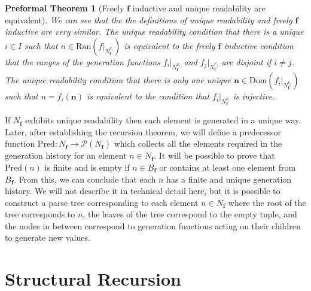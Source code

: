 \documentclass[oneside, 12pt]{book}
\theoremstyle{break}
\newtheorem{preformal definition}[definition]{Preformal Definition}
\newtheorem{preformal theorem}[theorem]{Preformal Theorem}
\newcommand{\bv}[1]{\boldsymbol{#1}}
\newcommand{\mc}[1]{\mathcal{#1}}
\begin{document}
				\begin{preformal theorem}[Freely $\bv{f}$ inductive and unique readability are equivalent]
					We can see that the the definitions of unique readability and freely $\bv{f}$ inductive are very similar.
					The unique readability condition that there is a unique $i\in I$ such that $n \in \text{Ran}\left(f|_{N_{\bv{f}}^{\nu_i}}\right)$ is equivalent to the freely $\bv{f}$ inductive condition that the ranges of the generation functions $f_i|_{N_{\bv{f}}^{\nu_i}}$ and $f_j|_{N_{\bv{f}}^{\nu_j}}$ are disjoint if $i\neq j$.
					The unique readability condition that there is only one unique $\bv{n} \in \text{Dom}\left(f_i|_{N_{\bv{f}}^{\nu_i}}\right)$ such that $n = f_i(\bv{n})$ is equivalent to the condition that $f_i|_{N_{\bv{f}}^{\nu_i}}$ is injective.
				\end{preformal theorem}
				
				If $N_{\bv{f}}$ exhibits unique readability then each element is generated in a unique way.
				Later, after establishing the recursion theorem, we will define a predecessor function $\text{Pred}: N_{\bv{f}} \to \mc{P}(N_{\bv{f}})$ which collects all the elements required in the generation history for an element $n\in N_{\bv{f}}$. 
				It will be possible to prove that $\text{Pred}(n)$ is finite and is empty if $n\in B_{\bv{f}}$ or contains at least one element from $B_{\bv{f}}$.
				From this, we can conclude that each $n$ has a finite and unique generation history.
				We will not describe it in technical detail here, but it is possible to construct a parse tree corresponding to each element $n\in N_{\bv{f}}$ where the root of the tree corresponds to $n$, the leaves of the tree correspond to the empty tuple, and the nodes in between correspond to generation functions acting on their children to generate new values. 
			
		\section{Structural Recursion}
		
\end{document}
